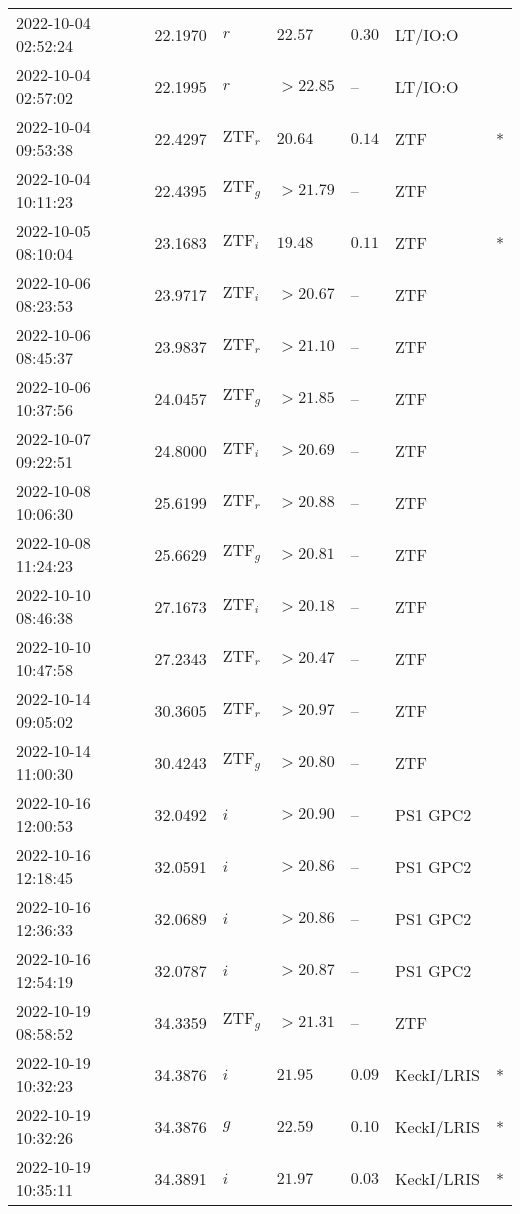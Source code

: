 \documentclass{nature_plusfigure}
\begin{document}
\begin{supplement}
\begin{center}
\begin{longtable}{lllllll}
2022-10-04 02:52:24 & 22.1970 & $r$ & $22.57$ & $0.30$ & LT/IO:O &  \\ 
2022-10-04 02:57:02 & 22.1995 & $r$ & $>22.85$ & -- & LT/IO:O &  \\ 
2022-10-04 09:53:38 & 22.4297 & $\mathrm{ZTF}_{r}$ & $20.64$ & $0.14$ & ZTF & * \\ 
2022-10-04 10:11:23 & 22.4395 & $\mathrm{ZTF}_{g}$ & $>21.79$ & -- & ZTF &  \\ 
2022-10-05 08:10:04 & 23.1683 & $\mathrm{ZTF}_{i}$ & $19.48$ & $0.11$ & ZTF & * \\ 
2022-10-06 08:23:53 & 23.9717 & $\mathrm{ZTF}_{i}$ & $>20.67$ & -- & ZTF &  \\ 
2022-10-06 08:45:37 & 23.9837 & $\mathrm{ZTF}_{r}$ & $>21.10$ & -- & ZTF &  \\ 
2022-10-06 10:37:56 & 24.0457 & $\mathrm{ZTF}_{g}$ & $>21.85$ & -- & ZTF &  \\ 
2022-10-07 09:22:51 & 24.8000 & $\mathrm{ZTF}_{i}$ & $>20.69$ & -- & ZTF &  \\ 
2022-10-08 10:06:30 & 25.6199 & $\mathrm{ZTF}_{r}$ & $>20.88$ & -- & ZTF &  \\ 
2022-10-08 11:24:23 & 25.6629 & $\mathrm{ZTF}_{g}$ & $>20.81$ & -- & ZTF &  \\ 
2022-10-10 08:46:38 & 27.1673 & $\mathrm{ZTF}_{i}$ & $>20.18$ & -- & ZTF &  \\ 
2022-10-10 10:47:58 & 27.2343 & $\mathrm{ZTF}_{r}$ & $>20.47$ & -- & ZTF &  \\ 
2022-10-14 09:05:02 & 30.3605 & $\mathrm{ZTF}_{r}$ & $>20.97$ & -- & ZTF &  \\ 
2022-10-14 11:00:30 & 30.4243 & $\mathrm{ZTF}_{g}$ & $>20.80$ & -- & ZTF &  \\ 
2022-10-16 12:00:53 & 32.0492 & $i$ & $>20.90$ & -- & PS1 GPC2 &  \\ 
2022-10-16 12:18:45 & 32.0591 & $i$ & $>20.86$ & -- & PS1 GPC2 &  \\ 
2022-10-16 12:36:33 & 32.0689 & $i$ & $>20.86$ & -- & PS1 GPC2 &  \\ 
2022-10-16 12:54:19 & 32.0787 & $i$ & $>20.87$ & -- & PS1 GPC2 &  \\ 
2022-10-19 08:58:52 & 34.3359 & $\mathrm{ZTF}_{g}$ & $>21.31$ & -- & ZTF &  \\ 
2022-10-19 10:32:23 & 34.3876 & $i$ & $21.95$ & $0.09$ & KeckI/LRIS & * \\ 
2022-10-19 10:32:26 & 34.3876 & $g$ & $22.59$ & $0.10$ & KeckI/LRIS & * \\ 
2022-10-19 10:35:11 & 34.3891 & $i$ & $21.97$ & $0.03$ & KeckI/LRIS & * \\ 

\end{longtable}
\end{center}
\end{supplement}
\end{document}
